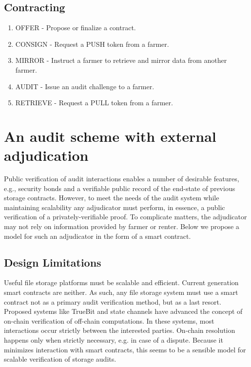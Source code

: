 \documentclass[a4paper,10pt]{article}
\begin{document}
\subsection{Contracting}
\begin{enumerate}
\setcounter{enumi}{\theenumTemp}
\item OFFER - Propose or finalize a contract.
\item CONSIGN - Request a PUSH token from a farmer.
\item MIRROR - Instruct a farmer to retrieve and mirror data from another farmer.
\item AUDIT - Issue an audit challenge to a farmer.
\item RETRIEVE - Request a PULL token from a farmer.
\end{enumerate}

\newpage
\section{An audit scheme with external adjudication}

Public verification of audit interactions enables a number of desirable features, e.g., security bonds and a verifiable public record of the end-state of previous storage contracts. However, to meet the needs of the audit system while maintaining scalability any adjudicator must perform, in essence, a public verification of a privately-verifiable proof. To complicate matters, the adjudicator may not rely on information provided by farmer or renter. Below we propose a model for such an adjudicator in the form of a smart contract.

\subsection{Design Limitations}

Useful file storage platforms must be scalable and efficient. Current generation smart contracts are neither. As such, any file storage system must use a smart contract not as a primary audit verification method, but as a last resort. Proposed systems like TrueBit \cite{30} and state channels \cite{33} have advanced the concept of on-chain verification of off-chain computations. In these systems, most interactions occur strictly between the interested parties. On-chain resolution happens only when strictly necessary, e.g. in case of a dispute. Because it minimizes interaction with smart contracts, this seems to be a sensible model for scalable verification of storage audits.
\end{document}
